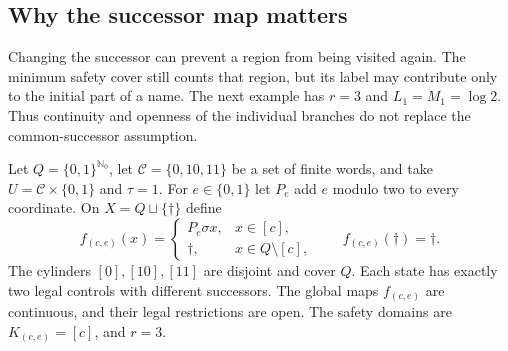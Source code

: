\documentclass[11pt,reqno]{amsart}
\numberwithin{equation}{section}
\theoremstyle{definition}
\theoremstyle{definition}
\newcommand{\Nzero}{\mathbb N_0}
\begin{document}
\subsection{Why the successor map matters}\label{sec:different}
Changing the successor can prevent a region from being visited again.
The minimum safety cover still counts that region, but its label may
contribute only to the initial part of a name. The next example has
$r=3$ and $L_1=M_1=\log2$. Thus continuity and openness of the
individual branches do not replace the common-successor assumption.

Let $Q=\{0,1\}^{\Nzero}$, let $\mathcal C=\{0,10,11\}$ be a set of
finite words, and take $U=\mathcal C\times\{0,1\}$ and $\tau=1$.
For $e\in\{0,1\}$ let $P_e$ add $e$ modulo two to every coordinate.
On $X=Q\sqcup\{\dagger\}$ define
\begin{equation}\label{cc-eq:boundarysystem}
 f_{(c,e)}(x)=
 \begin{cases}P_e\sigma x,&x\in[c],\\
 \dagger,&x\in Q\setminus[c],\end{cases}
 \qquad f_{(c,e)}(\dagger)=\dagger.
\end{equation}
The cylinders $[0],[10],[11]$ are disjoint and cover $Q$. Each state
has exactly two legal controls with different successors. The global
maps $f_{(c,e)}$ are continuous, and their legal restrictions are open.
The safety domains are $K_{(c,e)}=[c]$, and $r=3$.
\end{document}
